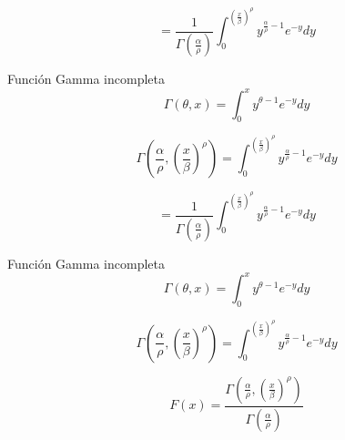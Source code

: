 \begin{frame}
    \begin{equation*}
        = \frac{1}{\Gamma \left( \frac{\alpha}{\rho} \right)}\int_{0}^{\left( \frac{x}{\beta} \right)^\rho} y^{\frac{\alpha}{\rho} - 1} e^{-y} dy
    \end{equation*}

    \begin{block}{Función Gamma incompleta}
        \begin{equation*}
            \Gamma(\theta, x) = \int_{0}^{x} y^{\theta - 1} e^{-y} dy
        \end{equation*}
    \end{block}

    \begin{block}{}
        \begin{equation*}
            \Gamma \left(\frac{\alpha}{\rho}, \left(\frac{x}{\beta} \right)^\rho \right) = \int_{0}^{\left( \frac{x}{\beta} \right)^\rho} y^{\frac{\alpha}{\rho} - 1} e^{-y} dy
        \end{equation*}
    \end{block}
\end{frame}

\begin{frame}
    \begin{equation*}
        = \frac{1}{\Gamma \left( \frac{\alpha}{\rho} \right)}\int_{0}^{\left( \frac{x}{\beta} \right)^\rho} y^{\frac{\alpha}{\rho} - 1} e^{-y} dy
    \end{equation*}

    \begin{block}{Función Gamma incompleta}
        \begin{equation*}
            \Gamma(\theta, x) = \int_{0}^{x} y^{\theta - 1} e^{-y} dy
        \end{equation*}
    \end{block}

    \begin{block}{}
        \begin{equation*}
            \Gamma \left(\frac{\alpha}{\rho}, \left(\frac{x}{\beta} \right)^\rho \right) = \int_{0}^{\left( \frac{x}{\beta} \right)^\rho} y^{\frac{\alpha}{\rho} - 1} e^{-y} dy
        \end{equation*}
    \end{block}

    \begin{equation*}
        F(x) = \frac{\Gamma \left(\frac{\alpha}{\rho}, \left(\frac{x}{\beta} \right)^\rho \right)}{\Gamma \left( \frac{\alpha}{\rho} \right)}
    \end{equation*}
\end{frame}

